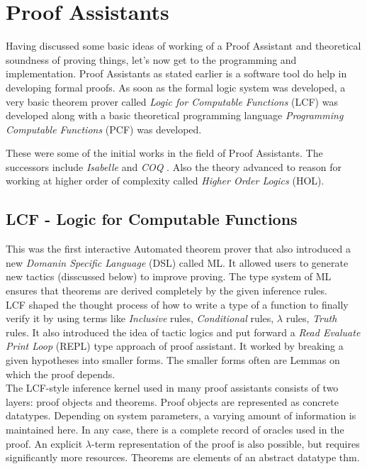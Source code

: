 \chapter{Proof Assistants }
Having discussed some basic ideas of working of a Proof Assistant and theoretical soundness of proving things, let's now get to the programming and implementation. Proof Assistants as stated earlier is a software tool do help in developing formal proofs. As soon as the formal logic system was developed, a very basic theorem prover called  \textit{Logic for Computable Functions} (LCF) \cite{lcf}  was developed along with a basic theoretical programming language \textit{Programming Computable Functions} (PCF) \cite{pcf}  was developed.

These were some of the initial works in the field of Proof Assistants. The successors include \textit{Isabelle} \cite{isabelle} and \textit{COQ} \cite{coq} . Also the theory advanced to reason for working at higher order of complexity called \textit{Higher Order Logics} (HOL).  


\section{LCF - Logic for Computable Functions}
This was the first interactive Automated theorem prover that also introduced a new \textit{Domanin Specific Language} (DSL) called ML. It allowed users to generate new tactics (disscussed below) to improve proving. The type system of ML ensures that theorems are derived completely by the given inference rules. \\

LCF shaped the thought process of how to write a type of a function to finally verify it by using terms like \textit{Inclusive} rules, \textit{Conditional} rules, \textit{$\lambda$} rules, \textit{Truth} rules. It also introduced the idea of tactic logics and put forward a \textit{Read Evaluate Print Loop} (REPL) type approach of proof assistant. It worked by breaking a given hypotheses into smaller forms. The smaller forms often are Lemmas on which the proof depends.\\

The  LCF-style  inference  kernel used in many proof assistants consists  of two layers: proof objects and theorems. Proof objects are represented as concrete datatypes. Depending on system parameters, a varying amount of information is maintained here. In any case, there is a complete record of oracles used in the proof. An explicit $\lambda$-term representation of the proof is also possible, but requires significantly more resources. Theorems are elements of an abstract datatype thm.\\

